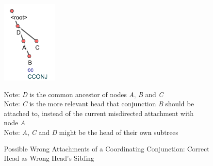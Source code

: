 \begin{figure}[H]
    \centering
    \includegraphics{img/nested1.png}
    \caption{Possible Wrong Attachments of a Coordinating Conjunction: Correct Head as Wrong Head's Sibling}
    \begin{flushleft}
    Note: \textit{D} is the common ancestor of nodes \textit{A}, \textit{B} and \textit{C}\\
    Note: \textit{C} is the more relevant head that conjunction \textit{B} should be attached to, instead of the current misdirected attachment with node \textit{A}\\
    Note: \textit{A}, \textit{C} and \textit{D} might be the head of their own subtrees
    \end{flushleft}
    \label{fig:conj-head1}
\end{figure}

